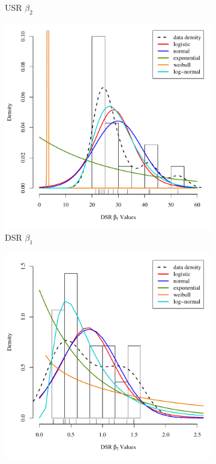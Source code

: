\begin{linenumbers}
\begin{figure}[htbp]
\begin{subfigure}{0.5\textwidth}
	\caption{USR $\beta_2$}
\end{subfigure}
\begin{subfigure}{0.5\textwidth}
	\centering
	\includegraphics[width=0.9\linewidth]{"Figures/Results_DSR/Stochastic/DSR B1 Dist"}
	\caption{DSR $\beta_1$}
\end{subfigure}%
\begin{subfigure}{0.5\textwidth}
	\centering
	\includegraphics[width=0.9\linewidth]{"Figures/Results_DSR/Stochastic/DSR B2 Dist"}

\end{subfigure}
\end{figure}
\end{linenumbers}
